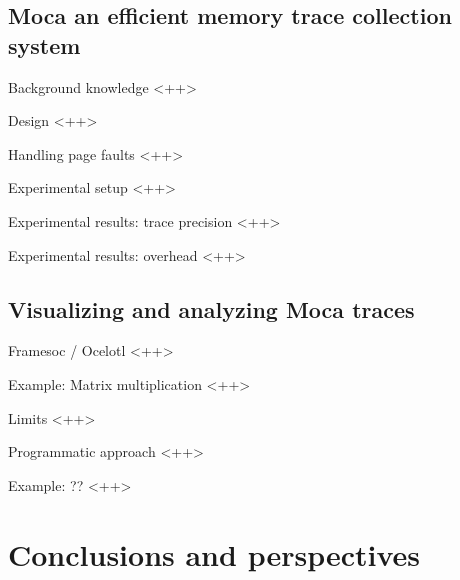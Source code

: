 \documentclass[xcolor={usenames,dvipsnames},hyperref={pdfusetitle}]{beamer}
\begin{document}
\subsection{Moca an efficient memory trace collection system}

\begin{frame}{Background knowledge}
    <++>
\end{frame}

\begin{frame}{Design}
    <++>
\end{frame}

\begin{frame}{Handling page faults}
    <++>
\end{frame}


\begin{frame}{Experimental setup}
    <++>
\end{frame}

\begin{frame}{Experimental results: trace precision}
    <++>
\end{frame}

\begin{frame}{Experimental results: overhead}
    <++>
\end{frame}

\subsection{Visualizing and analyzing Moca traces}

\begin{frame}{Framesoc / Ocelotl}
    <++>
\end{frame}

\begin{frame}{Example: Matrix multiplication}
    <++>
\end{frame}

\begin{frame}{Limits}
    <++>
\end{frame}

\begin{frame}{Programmatic approach}
    <++>
\end{frame}

\begin{frame}{Example: ??}
    <++>
\end{frame}

\section{Conclusions and perspectives}
\end{document}
